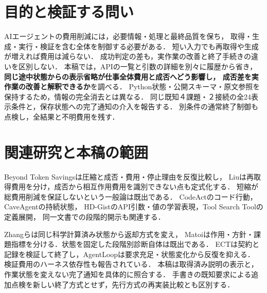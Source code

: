 \documentclass[letter]{ieicej}
\begin{document}
\maketitle
\begin{abstract}

\end{abstract}
\begin{keyword}\LetterJapaneseKeywords\end{keyword}
\begin{eabstract}

\end{eabstract}
\begin{ekeyword}\LetterEnglishKeywords\end{ekeyword}
\section{目的と検証する問い}
AIエージェントの費用削減には，必要情報・処理と最終品質を保ち，
取得・生成・実行・検証を含む全体を制御する必要がある．
短い入力でも再取得や生成が増えれば費用は減らない\cite{beyond,interaction}．
成功判定の差も，実作業の改善と終了手続きの違いを区別しない．
本稿では，APIの一覧と引数の詳細を別々に履歴から省き，
\textbf{同じ途中状態からの表示省略が仕事全体費用と成否へどう影響し，
成否差を実作業の改善と解釈できるか}を調べる．
Python状態・公開スキーマ・原文参照を保持するため，情報の完全消去とは異なる．
同じ既知４課題・２接続の全24表示条件と，保存状態への完了通知の介入を報告する．
別条件の通常終了制御も点検し，全結果と不明費用を残す．

\section{関連研究と本稿の範囲}
Beyond Token Savings\cite{beyond}は圧縮と成否・費用・停止理由を反復比較し，
Liu\cite{interaction}は再取得費用を分け，成否から相互作用費用を識別できない点も定式化する．
短縮が総費用削減を保証しないという一般論は既出である．
CodeAct\cite{codeact}のコード行動，CaveAgent\cite{cave}の持続状態，
HD-Gist\cite{hdgist}のAPI引数・値の学習表現，Tool Search Tool\cite{toolsearch}の定義展開，
同一文書での段階的開示\cite{disclosure}も関連する．

Zhangら\cite{evidence}は同じ科学計算済み状態から返却方式を変え，
Matoi\cite{matoi}は作用・方針・課題指標を分ける．状態を固定した段階別診断自体は既出である．
ECT\cite{ect}は契約と記録を検証して終了し，AgentLoop\cite{agentloop}は要求充足・状態変化から反復を抑える．
検証費用のハーネス依存性も報告されている\cite{waste}．
本稿は取得済み説明の表示と，作業状態を変えない完了通知を具体的に照合する．
手書きの既知要求による追加点検を新しい終了方式とせず，先行方式の再実装比較とも区別する．
\end{document}
